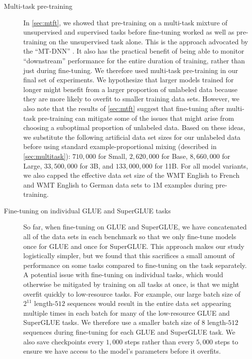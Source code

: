 \begin{description}
\item[Multi-task pre-training] In \ref{sec:mtft}, we showed that pre-training on a multi-task mixture of unsupervised and supervised tasks before fine-tuning worked as well as pre-training on the unsupervised task alone. This is the approach advocated by the ``MT-DNN'' \citep{liu2015representation,liu2019multi}. It also has the practical benefit of being able to monitor ``downstream'' performance for the entire duration of training, rather than just during fine-tuning. We therefore used multi-task pre-training in our final set of experiments. We hypothesize that larger models trained for longer might benefit from a larger proportion of unlabeled data because they are more likely to overfit to smaller training data sets. However, we also note that the results of \ref{sec:mtft} suggest that fine-tuning after multi-task pre-training can mitigate some of the issues that might arise from choosing a suboptimal proportion of unlabeled data. Based on these ideas, we substitute the following artificial data set sizes for our unlabeled data before using standard example-proportional mixing (described in \ref{sec:multitask}): $710{,}000$ for Small, $2{,}620{,}000$ for Base, $8{,}660{,}000$ for Large, $33{,}500{,}000$ for 3B, and $133{,}000{,}000$ for 11B. For all model variants, we also capped the effective data set size of the WMT English to French and WMT English to German data sets to $1\mathrm{M}$ examples during pre-training.

\item[Fine-tuning on individual GLUE and SuperGLUE tasks] So far, when fine-tuning on GLUE and SuperGLUE, we have concatenated all of the data sets in each benchmark so that we only fine-tune models once for GLUE and once for SuperGLUE. This approach makes our study logistically simpler, but we found that this sacrifices a small amount of performance on some tasks compared to fine-tuning on the task separately. A potential issue with fine-tuning on individual tasks, which would otherwise be mitigated by training on all tasks at once, is that we might overfit quickly to low-resource tasks. For example, our large batch size of $2^{11}$ length-$512$ sequences would result in the entire data set appearing multiple times in each batch for many of the low-resource GLUE and SuperGLUE tasks. We therefore use a smaller batch size of $8$ length-$512$ sequences during fine-tuning for each GLUE and SuperGLUE task. We also save checkpoints every $1{,}000$ steps rather than every $5{,}000$ steps to ensure we have access to the model's parameters before it overfits.


\end{description}
